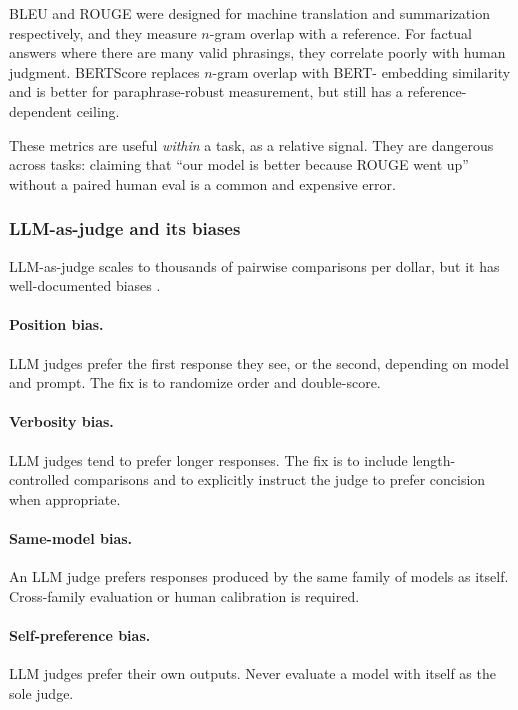 BLEU \citep{papineni2002bleu} and ROUGE \citep{lin2004rouge} were
designed for machine translation and summarization respectively,
and they measure $n$-gram overlap with a reference. For factual
answers where there are many valid phrasings, they correlate
poorly with human judgment. BERTScore
\citep{zhang2020bertscore} replaces $n$-gram overlap with BERT-
embedding similarity and is better for paraphrase-robust
measurement, but still has a reference-dependent ceiling.

These metrics are useful \emph{within} a task, as a relative
signal. They are dangerous across tasks: claiming that ``our
model is better because ROUGE went up'' without a paired human
eval is a common and expensive error.

\subsubsection{LLM-as-judge and its biases}

LLM-as-judge scales to thousands of pairwise comparisons per
dollar, but it has well-documented biases \citep{zheng2023llmjudge}.

\paragraph{Position bias.} LLM judges prefer the first response
they see, or the second, depending on model and prompt. The fix
is to randomize order and double-score.

\paragraph{Verbosity bias.} LLM judges tend to prefer longer
responses. The fix is to include length-controlled comparisons
and to explicitly instruct the judge to prefer concision when
appropriate.

\paragraph{Same-model bias.} An LLM judge prefers responses
produced by the same family of models as itself. Cross-family
evaluation or human calibration is required.

\paragraph{Self-preference bias.} LLM judges prefer their own
outputs. Never evaluate a model with itself as the sole judge.

